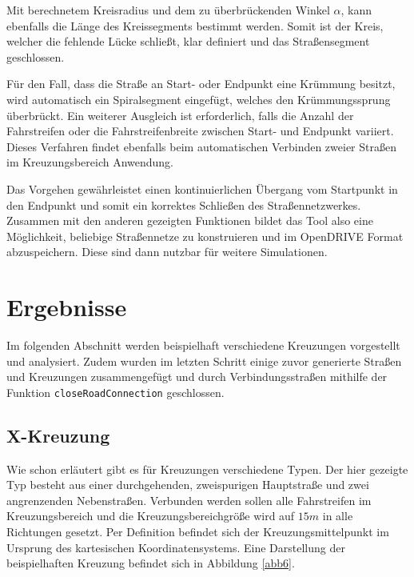 Mit berechnetem Kreisradius und dem zu überbrückenden Winkel \(\alpha\), kann ebenfalls die Länge des Kreissegments bestimmt werden. Somit ist der Kreis, welcher die fehlende Lücke schließt, klar definiert und das Straßensegment geschlossen.

Für den Fall, dass die Straße an Start- oder Endpunkt eine Krümmung besitzt, wird automatisch ein Spiralsegment eingefügt, welches den Krümmungssprung überbrückt. Ein weiterer Ausgleich ist erforderlich, falls die Anzahl der Fahrstreifen oder die Fahrstreifenbreite zwischen Start- und Endpunkt variiert. Dieses Verfahren findet ebenfalls beim automatischen Verbinden zweier Straßen im Kreuzungsbereich Anwendung.

Das Vorgehen gewährleistet einen kontinuierlichen Übergang vom Startpunkt in den Endpunkt und somit ein korrektes Schließen des Straßennetzwerkes. Zusammen mit den anderen gezeigten Funktionen bildet das Tool also eine Möglichkeit, beliebige Straßennetze zu konstruieren und im OpenDRIVE Format abzuspeichern. Diese sind dann nutzbar für weitere Simulationen.

\newpage
\chapter{Ergebnisse}

Im folgenden Abschnitt werden beispielhaft verschiedene Kreuzungen vorgestellt und analysiert. Zudem wurden im letzten Schritt einige zuvor generierte Straßen und Kreuzungen zusammengefügt und durch Verbindungsstraßen mithilfe der Funktion \texttt{closeRoadConnection} geschlossen.

\section{X-Kreuzung}
Wie schon erläutert gibt es für Kreuzungen verschiedene Typen. Der hier gezeigte Typ besteht aus einer durchgehenden, zweispurigen Hauptstraße und zwei angrenzenden Nebenstraßen. Verbunden werden sollen alle Fahrstreifen im Kreuzungsbereich und die Kreuzungsbereichgröße wird auf \(15 m\) in alle Richtungen gesetzt. Per Definition befindet sich der Kreuzungsmittelpunkt im Ursprung des kartesischen Koordinatensystems. Eine Darstellung der beispielhaften Kreuzung befindet sich in Abbildung \ref{abb6}.

